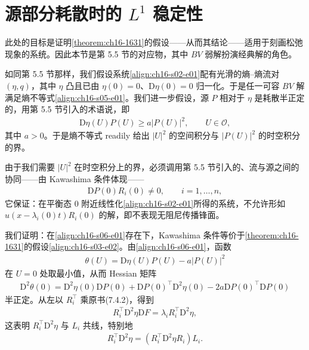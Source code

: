 \documentclass[../../main.tex]{subfiles}
\begin{document}
\section{源部分耗散时的 $L^1$ 稳定性}\label{section:ch16-部分耗散源l1稳定}

此处的目标是证明\cref{theorem:ch16-1631}的假设——从而其结论——适用于刻画松弛现象的系统。因此本节是第 5.5 节的对应物，其中 $BV$ 弱解扮演经典解的角色。

如同第 5.5 节那样，我们假设系统\eqref{align:ch16-s02-e01}配有光滑的熵--熵流对 $(\eta,q)$，其中 $\eta$ 凸且已由 $\eta(0)=0$、$\mathrm{D}\eta(0)=0$ 归一化。于是任一可容 $BV$ 解满足熵不等式\eqref{align:ch16-s05-e01}。我们进一步假设，源 $P$ 相对于 $\eta$ 是耗散半正定的，用第 5.5 节引入的术语说，即
\begin{align}
\mathrm{D}\eta(U)P(U)\geqslant a|P(U)|^2,\qquad U\in\mathscr{O},
\label{align:ch16-s06-e01}
\end{align}
其中 $a>0$。于是熵不等式 readily 给出 $|U|^2$ 的空间积分与 $|P(U)|^2$ 的时空积分的界。

由于我们需要 $|U|^2$ 在时空积分上的界，必须调用第 5.5 节引入的、流与源之间的协同——由 Kawashima 条件体现——
\begin{align}
\mathrm{D}P(0)R_i(0)\neq0,\qquad i=1,\ldots,n,
\label{align:ch16-s06-e02}
\end{align}
它保证：在平衡态 $0$ 附近线性化\eqref{align:ch16-s02-e01}所得的系统，不允许形如 $u(x-\lambda_i(0)t)R_i(0)$ 的解，即不表现无阻尼传播锋面。

我们证明：在\eqref{align:ch16-s06-e01}存在下，Kawashima 条件等价于\cref{theorem:ch16-1631}的假设\eqref{align:ch16-s03-e02}。由\eqref{align:ch16-s06-e01}，函数
\begin{align}
\theta(U)=\mathrm{D}\eta(U)P(U)-a|P(U)|^2
\label{align:ch16-s06-e03}
\end{align}
在 $U=0$ 处取最小值，从而 Hessian 矩阵
\begin{align}
\mathrm{D}^2\theta(0)=\mathrm{D}^2\eta(0)\mathrm{D}P(0)+\mathrm{D}P(0)^\top\mathrm{D}^2\eta(0)-2a\mathrm{D}P(0)^\top\mathrm{D}P(0)
\label{align:ch16-s06-e04}
\end{align}
半正定。从左以 $R_i^\top$ 乘原书(7.4.2)，得到
\begin{align}
R_i^\top\mathrm{D}^2\eta\mathrm{D}F=\lambda_iR_i^\top\mathrm{D}^2\eta,
\label{align:ch16-s06-e05}
\end{align}
这表明 $R_i^\top\mathrm{D}^2\eta$ 与 $L_i$ 共线，特别地
\begin{align}
R_i^\top\mathrm{D}^2\eta=(R_i^\top\mathrm{D}^2\eta R_i)L_i.
\label{align:ch16-s06-e06}
\end{align}
\end{document}
